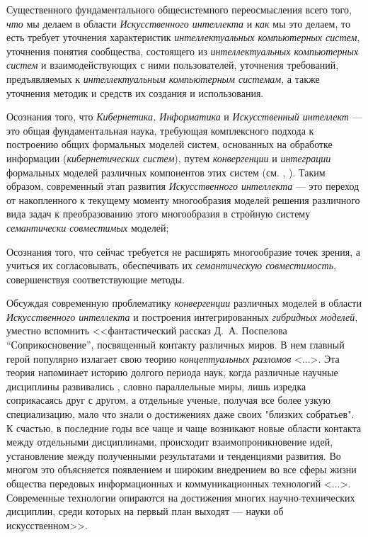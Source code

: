 \begin{textitemize}
	\item
	Существенного фундаментального общесистемного переосмысления всего того, \textit{что} мы делаем в области \textit{Искусственного интеллекта} и \textit{как} мы это делаем, то есть требует уточнения характеристик \textit{интеллектуальных компьютерных систем}, уточнения понятия сообщества, состоящего из \textit{интеллектуальных компьютерных систем} и взаимодействующих с ними пользователей, уточнения требований, предъявляемых к \textit{интеллектуальным компьютерным системам}, а также уточнения методик и средств их создания и использования.
	\item
	Осознания того, что \textit{Кибернетика, Информатика} и \textit{Искусственный интеллект} --- это общая фундаментальная наука, требующая комплексного подхода к построению общих формальных моделей систем, основанных на обработке информации (\textit{кибернетических систем}), путем \textit{конвергенции} и \textit{интеграции} формальных моделей различных компонентов этих систем (см. , ). Таким образом, современный этап развития \textit{Искусственного интеллекта} --- это переход от накопленного к текущему моменту многообразия моделей решения различного вида задач к преобразованию этого многообразия в стройную систему \textit{семантически совместимых} моделей;
	\item
	Осознания того, что сейчас требуется не расширять многообразие точек зрения, а учиться их согласовывать, обеспечивать их \textit{семантическую совместимость}, совершенствуя соответствующие методы.
\end{textitemize}

Обсуждая современную проблематику \textit{конвергенции} различных моделей в области \textit{Искусственного интеллекта} и построения интегрированных \textit{гибридных моделей}, уместно вспомнить <<фантастический рассказ Д.~А. Поспелова ``Соприкосновение'', посвященный контакту различных миров. В нем главный герой популярно излагает свою теорию \textit{концептуальных разломов} <...>. Эта теория напоминает историю долгого периода  наук, когда различные научные дисциплины развивались , словно параллельные миры, лишь изредка соприкасаясь друг с другом, а отдельные ученые, получая все более узкую специализацию, мало что знали о достижениях даже своих "близких собратьев". К счастью, в последние годы все чаще и чаще возникают новые области контакта между отдельными дисциплинами, происходит взаимопроникновение идей, установление  между полученными результатами и тенденциями развития. Во многом это объясняется появлением и широким внедрением во все сферы жизни общества передовых информационных и коммуникационных технологий <...>. Современные технологии опираются на достижения многих научно-технических дисциплин, среди которых на первый план выходят  --- науки об искусственном>>.
\begin{SCn}
\end{SCn}

